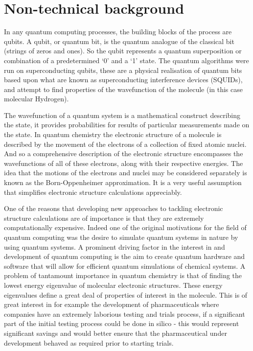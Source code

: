 \documentclass[12pt]{article}
\begin{document}
\section{Non-technical background}
In any quantum computing processes, the building blocks of the process are qubits. A qubit, or quantum bit, is the quantum analogue of the classical
 bit (strings of zeros and ones). So the qubit represents a quantum superposition or combination of a predetermined ‘0’ and a ‘1’ state. The quantum
  algorithms were run on superconducting qubits, these are a physical realisation of quantum bits based upon what are known as superconducting
  interference devices (SQUIDs), and attempt to find properties of the wavefunction of the molecule (in this case molecular Hydrogen).

The wavefunction of a quantum system is a mathematical construct describing the state, it provides probabilities for results of particular measurements
 made on the state. In quantum chemistry the electronic structure of a molecule is described by the movement of the electrons of a collection of fixed
  atomic nuclei. And so a comprehensive description of the electronic structure encompasses the wavefunctions of all of these electrons, along with
  their respective energies. The idea that the motions of the electrons and nuclei may be considered separately is known as the Born-Oppenheimer
  approximation. It is a very useful assumption that simplifies electronic structure calculations appreciably.

One of the reasons that developing new approaches to tackling electronic structure calculations are of importance is that they are extremely
computationally expensive. Indeed one of the original motivations for the field of quantum computing was the desire to simulate quantum systems
 in nature by using quantum systems. A prominent driving factor in the interest in and development of quantum computing is the aim to create quantum
  hardware and software that will allow for efficient quantum simulations of chemical systems. A problem of tantamount importance in quantum chemistry
  is that of finding the lowest energy eigenvalue of molecular electronic structures. These energy eigenvalues define a great deal of properties of
  interest in the molecule. This is of great interest in for example the development of pharmaceuticals where companies have an extremely laborious
  testing and trials process, if a significant part of the initial testing process could be done in silico - this would represent significant savings
  and would better ensure that the pharmaceutical under development behaved as required prior to starting trials.
\end{document}
